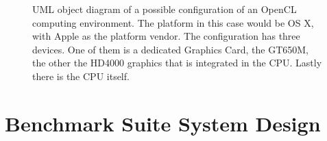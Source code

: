 \begin{figure}[H]
\begin{center}
		\caption{UML object diagram of a possible configuration of an OpenCL computing environment. The platform in this case would be OS X, with Apple as the platform vendor. The configuration has three devices. One of them is a dedicated Graphics Card, the GT650M, the other the HD4000 graphics that is integrated in the CPU. Lastly there is the CPU itself.}
		\label{fig:platform_example}
	\end{center}	
\end{figure}
\section{Benchmark Suite System Design}

